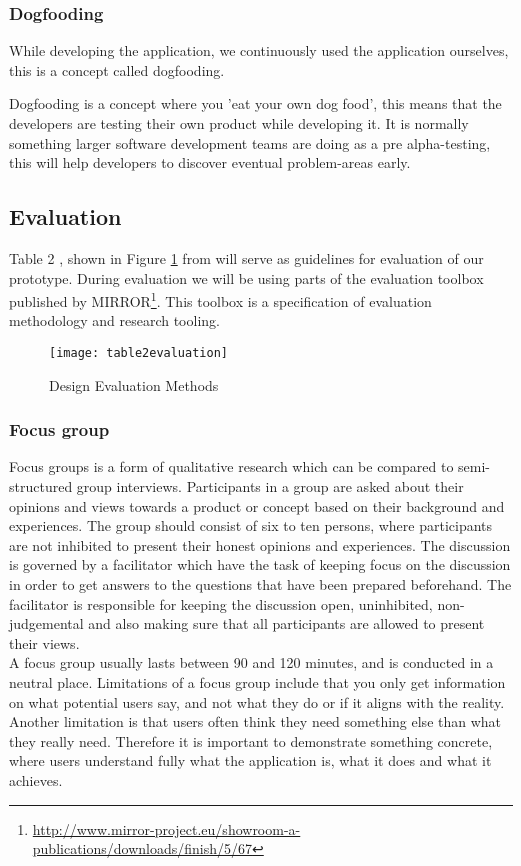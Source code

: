 \subsubsection*{Dogfooding}
While developing the application, we continuously used the application ourselves, this is a concept called dogfooding.

Dogfooding is a concept where you 'eat your own dog food', this means that the developers are testing their own product while developing it\citep{dogfooding}. It is normally something larger software development teams are doing as a pre alpha-testing, this will help developers to discover eventual problem-areas early.

\subsection{Evaluation} 
Table 2 , shown in Figure \ref{table2evaluation} from \citep{Esearch2004} will serve as guidelines for evaluation of our prototype.
During evaluation we will be using parts of the evaluation toolbox published by MIRROR\footnote{\url{http://www.mirror-project.eu/showroom-a-publications/downloads/finish/5/67}}. This toolbox is a specification of evaluation methodology and research tooling. 

\begin{figure}[H]
\centering
	\texttt{[image: table2evaluation]}
\caption{Design Evaluation Methods}
\label{table2evaluation}
\end{figure}

\subsubsection{Focus group}
Focus groups is a form of qualitative research which can be compared to semi-structured group interviews\citep{rogers2011interaction}. Participants in a group are asked about their opinions and views towards a product or concept based on their background and experiences\citep{krueger2008focus}. The group should consist of six to ten persons, where participants are not inhibited to present their honest opinions and experiences\citep{krueger2008focus}. The discussion is governed by a facilitator which have the task of keeping focus on the discussion in order to get answers to the questions that have been prepared beforehand\citep{krueger2008focus, nielsen1997use}. The facilitator is responsible for keeping the discussion open, uninhibited, non-judgemental and also making sure that all participants are allowed to present their views\citep{powell1996focus}. \\
A focus group usually lasts between 90 and 120 minutes, and is conducted in a neutral place. Limitations of a focus group include that you only get information on what potential users say, and not what they do or if it aligns with the reality\citep{nielsen1997use}. Another limitation is that users often think they need something else than what they really need. Therefore it is important to demonstrate something concrete, where users understand fully what the application is, what it does and what it achieves. 
 
